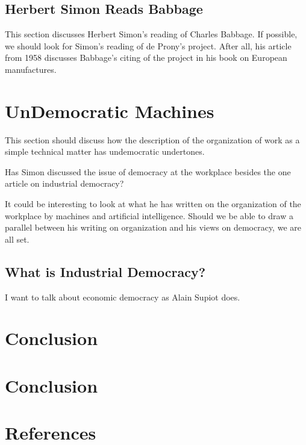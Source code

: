 \documentclass[version=last,draft=true,paper=A4,portrait,twoside=true,twocolumn=false,headinclude=false,footinclude=false,fontsize=11,BCOR=20mm,DIV=calc,pagesize=auto,titlepage=firstiscover,mpinclude=false,open=right,chapterprefix=true,numbers=autoendperiod,headsepline=false,parskip=false]{scrbook}
\begin{document}
\section{Herbert Simon Reads Babbage}
\label{sec:orge2c0c61}
This section discusses Herbert Simon's reading of Charles Babbage. If
possible, we should look for Simon's reading of de Prony's project. After
all, his article from 1958 discusses Babbage's citing of the project in his
book on European manufactures.

\chapter{UnDemocratic Machines}
\label{sec:org41f3f8c}
This section should discuss how the description of the organization of work
as a simple technical matter has undemocratic undertones. 

Has Simon discussed the issue of democracy at the workplace besides the one
article on industrial democracy?

It could be interesting to look at what he has written on the organization
of the workplace by machines and artificial intelligence. Should we be able
to draw a parallel between his writing on organization and his views on
democracy, we are all set. 
\section{What is Industrial Democracy?}
\label{sec:org6d0d66f}
I want to talk about economic democracy as Alain Supiot does.  


\lipsum
\chapter{Conclusion}
\label{sec:orga042e6b}
\lipsum

\backmatter
\chapter{Conclusion} 
\lipsum
\chapter{References} 
\printbibliography[heading=none]
\end{document}
